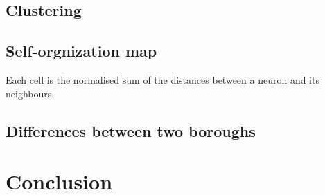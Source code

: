 \documentclass[12pt]{article}
\begin{document}
\subsection{Clustering}

\subsection{Self-orgnization map}


Each cell is the normalised sum of the distances between a neuron and its neighbours.

\subsection{Differences between two boroughs}
\section{Conclusion}

\newpage

\end{document}
